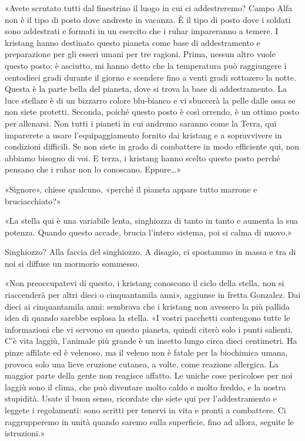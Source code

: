«Avete scrutato tutti dal finestrino il luogo in cui ci addestreremo?
Campo Alfa non è il tipo di posto dove andreste in vacanza. È il tipo di
posto dove i soldati sono addestrati e formati in un esercito che i
ruhar impareranno a temere. I kristang hanno destinato questo pianeta
come base di addestramento e preparazione per gli esseri umani per tre
ragioni. Prima, nessun altro vuole questo posto: è asciutto, mi hanno
detto che la temperatura può raggiungere i centodieci gradi durante il
giorno e scendere fino a venti gradi sottozero la notte. Questa è la
parte bella del pianeta, dove si trova la base di addestramento. La luce
stellare è di un bizzarro colore blu-bianco e vi sbuccerà la pelle dalle
ossa se non siete protetti. Seconda, poiché questo posto è così orrendo,
è un ottimo posto per allenarsi. Non tutti i pianeti in cui andremo
saranno come la Terra, qui imparerete a usare l'equipaggiamento fornito
dai kristang e a sopravvivere in condizioni difficili. Se non siete in
grado di combattere in modo efficiente qui, non abbiamo bisogno di voi.
E terza, i kristang hanno scelto questo posto perché pensano che i ruhar
non lo conoscano. Eppure\ldots»

«Signore», chiese qualcuno, «perché il pianeta appare tutto marrone e
bruciacchiato?»

«La stella qui è una variabile lenta, singhiozza di tanto in tanto e
aumenta la sua potenza. Quando questo accade, brucia l'intero sistema,
poi si calma di nuovo.»

Singhiozzo? Alla faccia del singhiozzo. A disagio, ci spostammo in massa
e tra di noi si diffuse un mormorio sommesso.

«Non preoccupatevi di questo, i kristang conoscono il ciclo della
stella, non si riaccenderà per altri dieci o cinquantamila anni»,
aggiunse in fretta Gonzalez. Dai dieci ai cinquantamila anni: sembrava
che i kristang non avessero la più pallida idea di quando sarebbe
esplosa la stella. «I vostri pacchetti contengono tutte le informazioni
che vi servono su questo pianeta, quindi citerò solo i punti salienti.
C'è vita laggiù, l'animale più grande è un insetto lungo circa dieci
centimetri. Ha pinze affilate ed è velenoso, ma il veleno non è fatale
per la biochimica umana, provoca solo una lieve eruzione cutanea, a
volte, come reazione allergica. La maggior parte della gente non
reagisce affatto. Le uniche cose pericolose per noi laggiù sono il
clima, che può diventare molto caldo e molto freddo, e la nostra
stupidità. Usate il buon senso, ricordate che siete qui per
l'addestramento e leggete i regolamenti: sono scritti per tenervi in
vita e pronti a combattere. Ci raggrupperemo in unità quando saremo
sulla superficie, fino ad allora, seguite le istruzioni.»